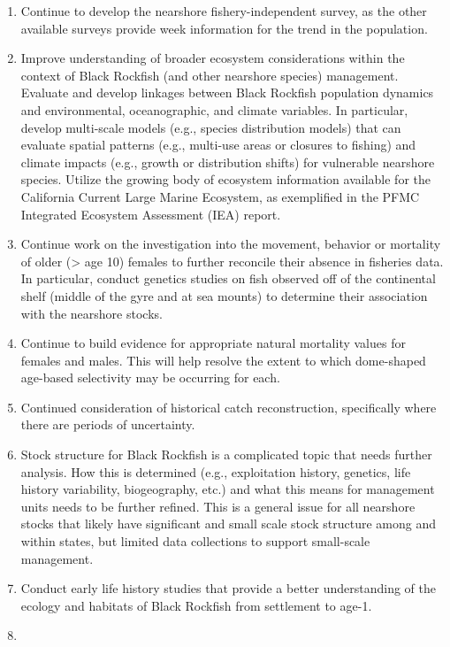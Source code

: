 \documentclass[11pt,
  english,
  letterpaper,
]{article}
\providecommand{\tightlist}{%
  \setlength{\itemsep}{0pt}\setlength{\parskip}{0pt}}
\providecommand{\tightlist}{%
  \setlength{\itemsep}{0pt}\setlength{\parskip}{0pt}}
\begin{document}
\begin{enumerate}
\def\labelenumi{\arabic{enumi}.}
\tightlist
\item
  Continue to develop the nearshore fishery-independent survey, as the other available surveys provide week information for the trend in the population.
\item
  Improve understanding of broader ecosystem considerations within the context of Black Rockfish (and other nearshore species) management. Evaluate and develop linkages between Black Rockfish population dynamics and environmental, oceanographic, and climate variables. In particular, develop multi-scale models (e.g., species distribution models) that can evaluate spatial patterns (e.g., multi-use areas or closures to fishing) and climate impacts (e.g., growth or distribution shifts) for vulnerable nearshore species. Utilize the growing body of ecosystem information available for the California Current Large Marine Ecosystem, as exemplified in the PFMC Integrated Ecosystem Assessment (IEA) report.
\item
  Continue work on the investigation into the movement, behavior or mortality of older (\textgreater{} age 10) females to further reconcile their absence in fisheries data. In particular, conduct genetics studies on fish observed off of the continental shelf (middle of the gyre and at sea mounts) to determine their association with the nearshore stocks.
\item
  Continue to build evidence for appropriate natural mortality values for females and males. This will help resolve the extent to which dome-shaped age-based selectivity may be occurring for each.
\item
  Continued consideration of historical catch reconstruction, specifically where there are periods of uncertainty.
\item
  Stock structure for Black Rockfish is a complicated topic that needs further analysis. How this is determined (e.g., exploitation history, genetics, life history variability, biogeography, etc.) and what this means for management units needs to be further refined. This is a general issue for all nearshore stocks that likely have significant and small scale stock structure among and within states, but limited data collections to support small-scale management.
\item
  Conduct early life history studies that provide a better understanding of the ecology and habitats of Black Rockfish from settlement to age-1.
\item

\end{enumerate}
\end{document}
